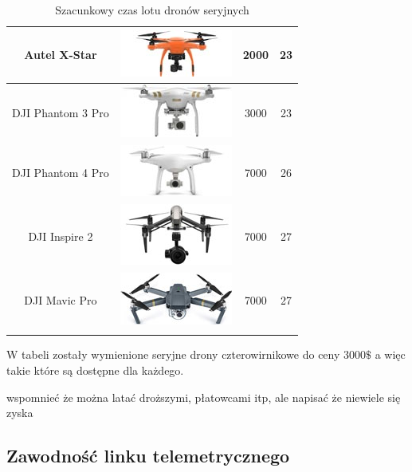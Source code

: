 \begin{longtable}{|c|c|c|c|}
    	    Autel X-Star & \includegraphics{zalaczniki/obrazy/drony_miniaturki/autel.jpg} & 2000 & 23 \\ \hline
    	    DJI Phantom 3 Pro & \includegraphics{zalaczniki/obrazy/drony_miniaturki/dji-phantom-3-professional.jpg} & 3000 & 23 \\ \hline
    	    DJI Phantom 4 Pro & \includegraphics{zalaczniki/obrazy/drony_miniaturki/DJI-Phantom-4.jpg} & 7000 & 26 \\ \hline
    	    DJI Inspire 2 & \includegraphics{zalaczniki/obrazy/drony_miniaturki/dji_inspire.jpg} & 7000 & 27 \\ \hline
    	    DJI Mavic Pro & \includegraphics{zalaczniki/obrazy/drony_miniaturki/dji_mavic.jpg} & 7000 & 27 \\ \hline
    \caption{Szacunkowy czas lotu dronów seryjnych \cite{szacunkowyczaslotu}}
    \label{tab:czasLotuDronow}
\end{longtable}

W tabeli zostały wymienione seryjne drony czterowirnikowe do ceny $3000\$$ a więc takie które są dostępne dla każdego. 

wspomnieć że można latać droższymi, płatowcami itp, ale napisać że niewiele się zyska
\subsection{Zawodność linku telemetrycznego}

